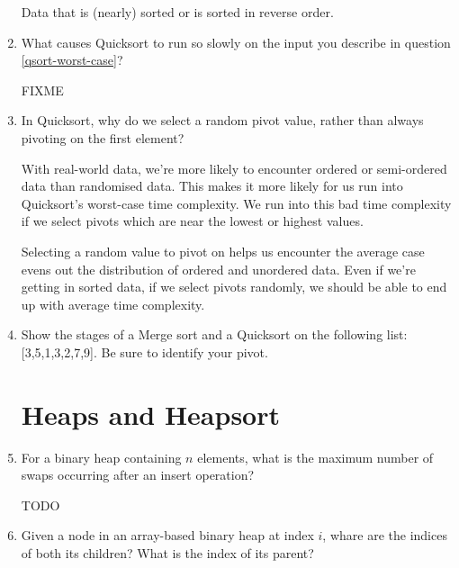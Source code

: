 \documentclass[11pt]{article}
\newenvironment{answer}{\large\lstset{basicstyle=\large}\color{white}}{}
\newenvironment{answer}{\large\lstset{basicstyle=\large}\color{red}}{}
\begin{document}
\begin{enumerate}
      \begin{answer}
      Data that is (nearly) sorted or is sorted in reverse order.
      \end{answer}

\item What causes Quicksort to run so slowly on the input you describe in
      question \ref{qsort-worst-case}?

    \begin{answer}
    {\huge FIXME}
    \end{answer}

\item In Quicksort, why do we select a random pivot value, rather than always
      pivoting on the first element?

      \begin{answer}
      With real-world data, we're more likely to encounter ordered or
      semi-ordered data than randomised data. This makes it more likely for us
      run into Quicksort's worst-case time complexity. We run into this bad
      time complexity if we select pivots which are near the lowest or highest
      values.

      Selecting a random value to pivot on helps us encounter the average case
      evens out the distribution of ordered and unordered data. Even if we're
      getting in sorted data, if we select pivots randomly, we should be able
      to end up with average time complexity.
      \end{answer}

\item Show the stages of a Merge sort and a Quicksort on the following list:
      [3,5,1,3,2,7,9]. Be sure to identify your pivot.

    \begin{answer}
    \end{answer}

\section*{Heaps and Heapsort}

\item For a binary heap containing $n$ elements, what is the maximum number of
      swaps occurring after an insert operation?

    \begin{answer}
    \Huge TODO
    \end{answer}

\item Given a node in an array-based binary heap at index $i$, whare are the
      indices of both its children? What is the index of its parent?


\end{enumerate}
\end{document}
